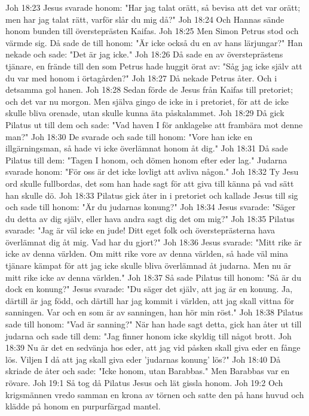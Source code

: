 Joh 18:23  Jesus svarade honom: "Har jag talat orätt, så bevisa att det var orätt; men har jag talat rätt, varför slår du mig då?"
Joh 18:24  Och Hannas sände honom bunden till översteprästen Kaifas.
Joh 18:25  Men Simon Petrus stod och värmde sig. Då sade de till honom: "Är icke också du en av hans lärjungar?" Han nekade och sade: "Det är jag icke."
Joh 18:26  Då sade en av översteprästens tjänare, en frände till den som Petrus hade huggit örat av: "Såg jag icke själv att du var med honom i örtagården?"
Joh 18:27  Då nekade Petrus åter. Och i detsamma gol hanen.
Joh 18:28  Sedan förde de Jesus från Kaifas till pretoriet; och det var nu morgon. Men själva gingo de icke in i pretoriet, för att de icke skulle bliva orenade, utan skulle kunna äta påskalammet.
Joh 18:29  Då gick Pilatus ut till dem och sade: "Vad haven I för anklagelse att frambära mot denne man?"
Joh 18:30  De svarade och sade till honom: "Vore han icke en illgärningsman, så hade vi icke överlämnat honom åt dig."
Joh 18:31  Då sade Pilatus till dem: "Tagen I honom, och dömen honom efter eder lag." Judarna svarade honom: "För oss är det icke lovligt att avliva någon."
Joh 18:32  Ty Jesu ord skulle fullbordas, det som han hade sagt för att giva till känna på vad sätt han skulle dö.
Joh 18:33  Pilatus gick åter in i pretoriet och kallade Jesus till sig och sade till honom: "Är du judarnas konung?"
Joh 18:34  Jesus svarade: "Säger du detta av dig själv, eller hava andra sagt dig det om mig?"
Joh 18:35  Pilatus svarade: "Jag är väl icke en jude! Ditt eget folk och översteprästerna hava överlämnat dig åt mig. Vad har du gjort?"
Joh 18:36  Jesus svarade: "Mitt rike är icke av denna världen. Om mitt rike vore av denna världen, så hade väl mina tjänare kämpat för att jag icke skulle bliva överlämnad åt judarna. Men nu är mitt rike icke av denna världen."
Joh 18:37  Så sade Pilatus till honom: "Så är du dock en konung?" Jesus svarade: "Du säger det själv, att jag är en konung. Ja, därtill är jag född, och därtill har jag kommit i världen, att jag skall vittna för sanningen. Var och en som är av sanningen, han hör min röst."
Joh 18:38  Pilatus sade till honom: "Vad är sanning?" När han hade sagt detta, gick han åter ut till judarna och sade till dem: "Jag finner honom icke skyldig till något brott.
Joh 18:39  Nu är det en sedvänja hos eder, att jag vid påsken skall giva eder en fånge lös. Viljen I då att jag skall giva eder 'judarnas konung' lös?"
Joh 18:40  Då skriade de åter och sade: "Icke honom, utan Barabbas." Men Barabbas var en rövare.
Joh 19:1  Så tog då Pilatus Jesus och lät gissla honom.
Joh 19:2  Och krigsmännen vredo samman en krona av törnen och satte den på hans huvud och klädde på honom en purpurfärgad mantel.
